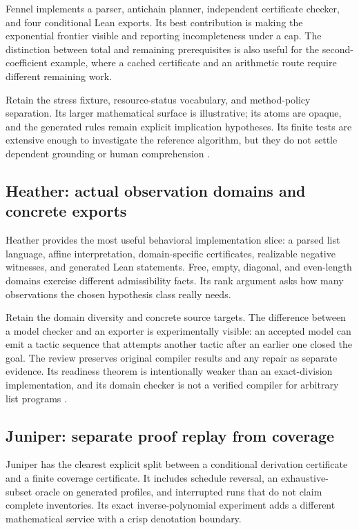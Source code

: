 \documentclass[11pt,letterpaper]{article}
\theoremstyle{definition}\newtheorem{definition}[proposition]{Definition}
\theoremstyle{remark}\newtheorem{remark}[proposition]{Remark}
\begin{document}
Fennel implements a parser, antichain planner, independent certificate
checker, and four conditional Lean exports. Its best contribution is making
the exponential frontier visible and reporting incompleteness under a cap.
The distinction between total and remaining prerequisites is also useful
for the second-coefficient example, where a cached certificate and an
arithmetic route require different remaining work.

Retain the stress fixture, resource-status vocabulary, and method-policy
separation. Its larger mathematical surface is illustrative; its atoms are
opaque, and the generated rules remain explicit implication hypotheses.
Its finite tests are extensive enough to investigate the reference algorithm,
but they do not settle dependent grounding or human comprehension
\cite{fennel}.

\subsection{Heather: actual observation domains and concrete exports}

Heather provides the most useful behavioral implementation slice: a parsed
list language, affine interpretation, domain-specific certificates, realizable
negative witnesses, and generated Lean statements. Free, empty, diagonal,
and even-length domains exercise different admissibility facts. Its rank
argument asks how many observations the chosen hypothesis class really needs.

Retain the domain diversity and concrete source targets. The difference
between a model checker and an exporter is experimentally visible: an accepted
model can emit a tactic sequence that attempts another tactic after an earlier
one closed the goal. The review preserves original compiler results and any
repair as separate evidence. Its readiness theorem is intentionally weaker
than an exact-division implementation, and its domain checker is not a
verified compiler for arbitrary list programs \cite{heather}.

\subsection{Juniper: separate proof replay from coverage}

Juniper has the clearest explicit split between a conditional derivation
certificate and a finite coverage certificate. It includes schedule reversal,
an exhaustive-subset oracle on generated profiles, and interrupted runs that
do not claim complete inventories. Its exact inverse-polynomial experiment
adds a different mathematical service with a crisp denotation boundary.
\end{document}
